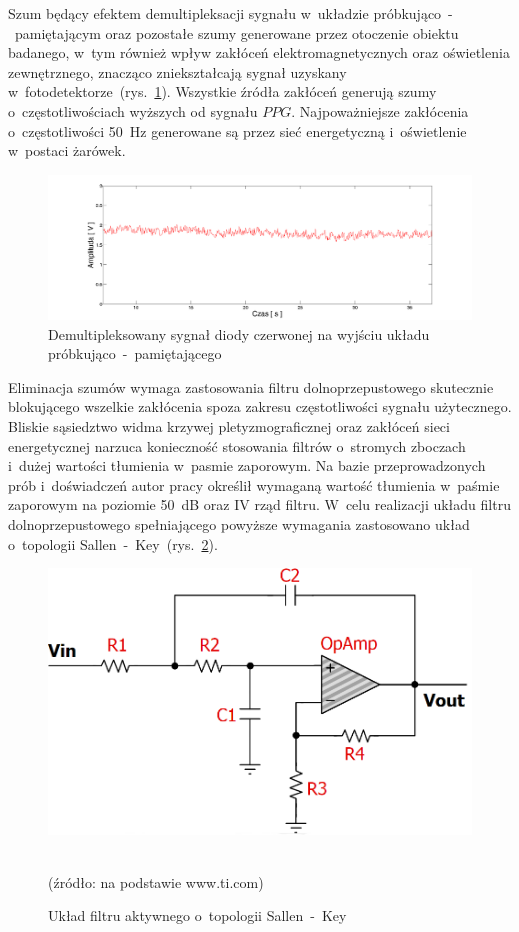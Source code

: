 Szum będący efektem demultipleksacji sygnału w~układzie próbkująco~-~pamiętającym oraz pozostałe szumy generowane przez otoczenie obiektu badanego, w~tym również wpływ zakłóceń elektromagnetycznych oraz oświetlenia 
zewnętrznego, znacząco zniekształcają sygnał uzyskany w~fotodetektorze~(rys.~\ref{rys:filtr1}). Wszystkie źródła zakłóceń generują szumy o~częstotliwościach wyższych od sygnału $PPG$. Najpoważniejsze zakłócenia 
o~częstotliwości 50~Hz generowane są przez sieć energetyczną i~oświetlenie w~postaci żarówek.
\begin{figure}[!ht]
	\centerline{\includegraphics[scale = 0.39]{graphic/filtr1}}
	\caption{Demultipleksowany sygnał diody czerwonej na wyjściu układu próbkująco~-~pamiętającego}
	\label{rys:filtr1}
\end{figure}

Eliminacja szumów  wymaga zastosowania filtru dolnoprzepustowego skutecznie blokującego wszelkie zakłócenia spoza zakresu częstotliwości sygnału użytecznego.
Bliskie sąsiedztwo widma krzywej pletyzmograficznej oraz zakłóceń sieci energetycznej narzuca konieczność stosowania filtrów o~stromych zboczach i~dużej
wartości tłumienia w~pasmie zaporowym. 
Na bazie przeprowadzonych prób i~doświadczeń autor pracy określił wymaganą wartość tłumienia w~paśmie zaporowym na poziomie 50~dB oraz IV rząd filtru. W~celu 
realizacji układu filtru dolnoprzepustowego spełniającego powyższe wymagania zastosowano układ o~topologii Sallen~-~Key~(rys.~\ref{rys:sallenKey}). 
\begin{figure}[!ht]
	\centerline{\includegraphics[scale = 0.43]{graphic/sallenKey}}
	\caption{Układ filtru aktywnego o~topologii Sallen~-~Key}
	~\\
	(źródło: na podstawie www.ti.com)
	\label{rys:sallenKey}
\end{figure}

